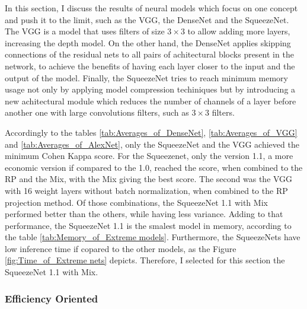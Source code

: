 In this section, I discuss the results of neural models which focus on one concept and push it to the limit, such as the VGG, the DenseNet and the SqueezeNet. The VGG is a model that uses filters of size $3\times 3$ to allow adding more layers, increasing the depth model. On the other hand, the DenseNet applies skipping connections of the residual nets to all pairs of achitectural blocks present in the network, to achieve the benefits of having each layer closer to the input and the output of the model. Finally, the SqueezeNet tries to reach minimum memory usage not only by applying model compression techiniques but by introducing a new achitectural module which reduces the number of channels of a layer before another one with large convolutions filters, such as $3 \times 3$ filters. 

Accordingly to the tables \ref{tab:Averages_of_DenseNet}, \ref{tab:Averages_of_VGG} and \ref{tab:Averages_of_AlexNet}, only the SqueezeNet and the VGG achieved the minimum Cohen Kappa score. For the Squeezenet, only the version 1.1, a more economic version if compared to the 1.0, reached the score, when combined to the \acrshort{RP} and the \acrshort{Mix}, with the \acrshort{Mix} giving the best score. The second was the VGG with 16 weight layers without batch normalization, when combined to the \acrshort{RP} projection method. Of those combinations, the SqueezeNet 1.1 with \acrshort{Mix} performed better than the others, while having less variance. Adding to that performance, the SqueezeNet 1.1 is the smalest model in memory, according to the table \ref{tab:Memory_of_Extreme models}. Furthermore, the SqueezeNets have low inference time if copared to the other models, as the Figure \ref{fig:Time_of_Extreme nets} depicts. Therefore, I selected for this section the SqueezeNet 1.1 with \acrshort{Mix}.






\FloatBarrier

\subsubsection{Efficiency Oriented}

